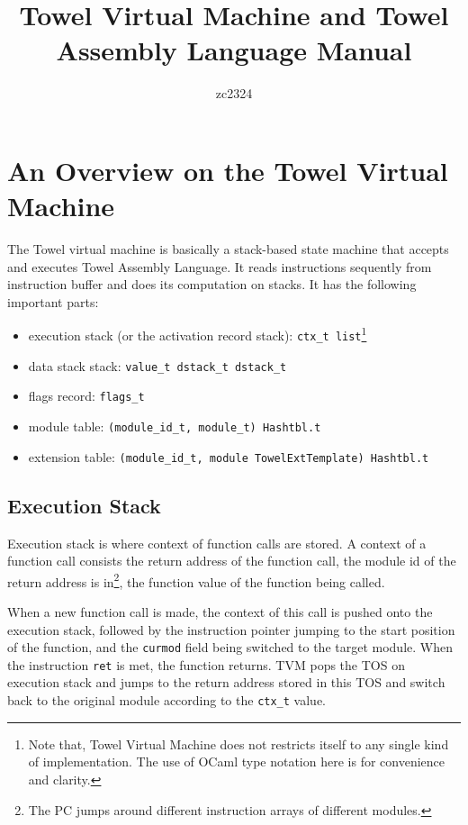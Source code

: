 \documentclass{article}
\title{Towel Virtual Machine and Towel Assembly Language Manual}
\author{zc2324}
\begin{document}
\maketitle
\tableofcontents

\section{An Overview on the Towel Virtual Machine}

The Towel virtual machine is basically a stack-based state machine that accepts and executes Towel Assembly Language. It reads instructions sequently from instruction buffer and does its computation on stacks. It has the following important parts:
\begin{itemize}
\item execution stack (or the activation record stack): \texttt{ctx\_t list}\footnote{Note that, Towel Virtual Machine does not restricts itself to any single kind of implementation. The use of OCaml type notation here is for convenience and clarity.}
\item data stack stack: \texttt{value\_t dstack\_t dstack\_t}
\item flags record: \texttt{flags\_t}
\item module table: \texttt{(module\_id\_t, module\_t) Hashtbl.t}
\item extension table: \texttt{(module\_id\_t, module TowelExtTemplate) Hashtbl.t}
\end{itemize}

\subsection{Execution Stack}

Execution stack is where context of function calls are stored. A context of a function call consists the return address of the function call, the module id of the return address is in\footnote{The PC jumps around different instruction arrays of different modules.}, the function value of the function being called.

When a new function call is made, the context of this call is pushed onto the execution stack, followed by the instruction pointer jumping to the start position of the function, and the \texttt{curmod} field being switched to the target module. When the instruction \texttt{ret} is met, the function returns. TVM pops the TOS on execution stack and jumps to the return address stored in this TOS and switch back to the original module according to the \texttt{ctx\_t} value.
\end{document}
